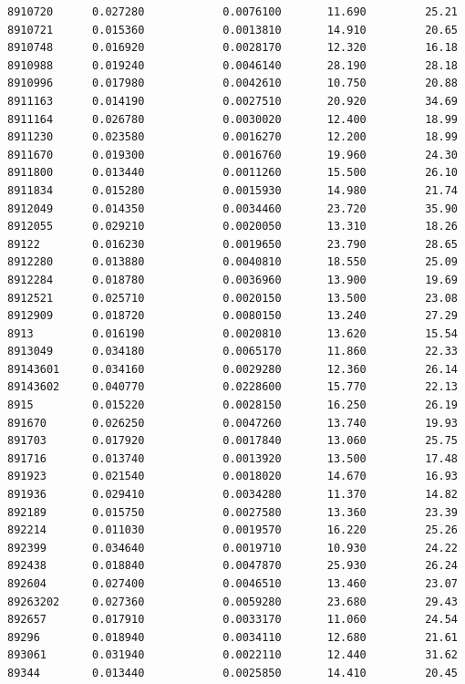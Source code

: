 \documentclass[
  letterpaper,
  DIV=11,
  numbers=noendperiod]{scrartcl}
\begin{document}
\begin{verbatim}
8910720      0.027280            0.0076100       11.690         25.21
8910721      0.015360            0.0013810       14.910         20.65
8910748      0.016920            0.0028170       12.320         16.18
8910988      0.019240            0.0046140       28.190         28.18
8910996      0.017980            0.0042610       10.750         20.88
8911163      0.014190            0.0027510       20.920         34.69
8911164      0.026780            0.0030020       12.400         18.99
8911230      0.023580            0.0016270       12.200         18.99
8911670      0.019300            0.0016760       19.960         24.30
8911800      0.013440            0.0011260       15.500         26.10
8911834      0.015280            0.0015930       14.980         21.74
8912049      0.014350            0.0034460       23.720         35.90
8912055      0.029210            0.0020050       13.310         18.26
89122        0.016230            0.0019650       23.790         28.65
8912280      0.013880            0.0040810       18.550         25.09
8912284      0.018780            0.0036960       13.900         19.69
8912521      0.025710            0.0020150       13.500         23.08
8912909      0.018720            0.0080150       13.240         27.29
8913         0.016190            0.0020810       13.620         15.54
8913049      0.034180            0.0065170       11.860         22.33
89143601     0.034160            0.0029280       12.360         26.14
89143602     0.040770            0.0228600       15.770         22.13
8915         0.015220            0.0028150       16.250         26.19
891670       0.026250            0.0047260       13.740         19.93
891703       0.017920            0.0017840       13.060         25.75
891716       0.013740            0.0013920       13.500         17.48
891923       0.021540            0.0018020       14.670         16.93
891936       0.029410            0.0034280       11.370         14.82
892189       0.015750            0.0027580       13.360         23.39
892214       0.011030            0.0019570       16.220         25.26
892399       0.034640            0.0019710       10.930         24.22
892438       0.018840            0.0047870       25.930         26.24
892604       0.027400            0.0046510       13.460         23.07
89263202     0.027360            0.0059280       23.680         29.43
892657       0.017910            0.0033170       11.060         24.54
89296        0.018940            0.0034110       12.680         21.61
893061       0.031940            0.0022110       12.440         31.62
89344        0.013440            0.0025850       14.410         20.45

\end{verbatim}
\end{document}
